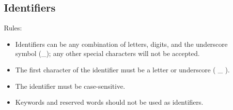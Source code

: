 \subsection{Identifiers}
Rules:
\begin{itemize}
\item Identifiers can be any combination of letters, digits, and the underscore symbol (\_); any other special characters will not be accepted.
  \item The first character of the identifier must be a letter or underscore ( \_ ).
\item The identifier must be case-sensitive.
\item Keywords and reserved words should not be used as identifiers.
\end{itemize}